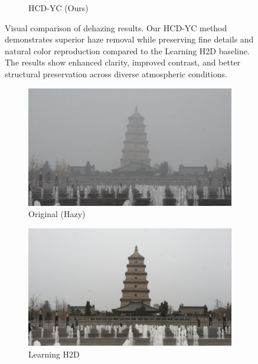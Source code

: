 \documentclass{article}
\begin{document}
\begin{figure}[t]
\begin{subfigure}[b]{0.32\textwidth}
    \caption{HCD-YC (Ours)}
\end{subfigure}
\caption{Visual comparison of dehazing results. Our HCD-YC method demonstrates superior haze removal while preserving fine details and natural color reproduction compared to the Learning H2D baseline. The results show enhanced clarity, improved contrast, and better structural preservation across diverse atmospheric conditions.}
\label{fig:visual_comparison_1}
\end{figure}

\begin{figure}[t]
\centering
\begin{subfigure}[b]{0.32\textwidth}
    \centering
    \includegraphics[width=\textwidth]{examples_original/4.png}
    \caption{Original (Hazy)}
\end{subfigure}
\hfill
\begin{subfigure}[b]{0.32\textwidth}
    \centering
    \includegraphics[width=\textwidth]{examples_baseline/4.png}
    \caption{Learning H2D}
\end{subfigure}
\hfill
\begin{subfigure}[b]{0.32\textwidth}

\end{subfigure}
\end{figure}
\end{document}
